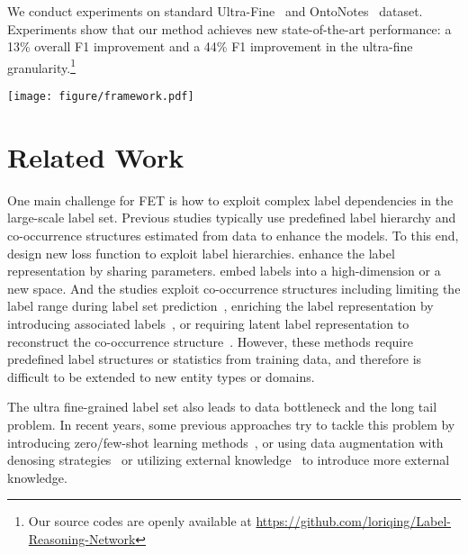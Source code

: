 \documentclass[11pt]{article}
\begin{document}
We conduct experiments on standard Ultra-Fine~\citep{choi2018ultra_data1} and OntoNotes~\citep{ontonotes_data2} dataset. Experiments show that our method achieves new state-of-the-art performance: a 13\% overall F1 improvement and a 44\% F1 improvement in the ultra-fine granularity.\footnote{Our source codes are openly available at \href{https://github.com/loriqing/Label-Reasoning-Network}{https://github.com/loriqing/Label-Reasoning-Network}}

\begin{figure*}[tbh!]
\setlength{\belowcaptionskip}{-0cm}
\centering
\texttt{[image: figure/framework.pdf]}
\caption{Overview of the process for LRN which contains an encoder, a deductive reasoning-based decoder and an inductive reasoning-based decoder. The figure shows: at step 1, the label \textit{person} is predicted by deductive reasoning, and the attribute \texttt{human} is activated; at step 3, the label \textit{scientist} is generated by inductive reasoning.}
\label{Fig.framework}
\end{figure*}

\section{Related Work}
One main challenge for FET is how to exploit complex label dependencies in the large-scale label set. Previous studies typically use predefined label hierarchy and co-occurrence structures estimated from data to enhance the models. To this end, \citet{ren2016afet_hier1, XuandBarbosa2018neural_hier2, DBLP:conf/ijcai/WuZMGH19_hier3, DBLP:conf/acl/ChenCD20_onto_hier4} design new loss function to exploit label hierarchies. \citet{DBLP:conf/eacl/AbhishekAA17_hier5} enhance the label representation by sharing parameters. \citet{DBLP:conf/eacl/InuiRSS17_shimaoka_hier7, McCallumVVMR18_space1, DBLP:conf/emnlp/Lopez020_hyper} embed labels into a high-dimension or a new space. And the studies exploit co-occurrence structures including limiting the label range during label set prediction~\citep{DBLP:conf/acl/RabinovichK17_core1}, enriching the label representation by introducing associated labels~\citep{xiong2019imposing_core2}, or requiring latent label representation to reconstruct the co-occurrence structure~\citep{linandJi2019attentive_core3}. However, these methods require predefined label structures or statistics from training data, and therefore is difficult to be extended to new entity types or domains.

The ultra fine-grained label set also leads to data bottleneck and the long tail problem. In recent years, some previous approaches try to tackle this problem by introducing zero/few-shot learning methods~\citep{ma2016label_few1, HuangMPJ16_open1, ZhouKTR18_open2, YuanD18_few2, obeidat2019description_few3, zhang2020mzet_few4, DBLP:conf/www/RenLZ20_zero}, or using data augmentation with denosing strategies~\citep{DBLP:conf/kdd/RenHQVJH16_denoise3, DBLP:conf/naacl/OnoeD19_elmo, DBLP:conf/ijcai/ZhangLXZXHW20_denoise1, DBLP:conf/aaai/AliSLW20_denoise2} or utilizing external knowledge~\citep{DBLP:conf/emnlp/CorroAGW15_KB, DBLP:conf/emnlp/DaiDLS19_el} to introduce more external knowledge.
\end{document}
